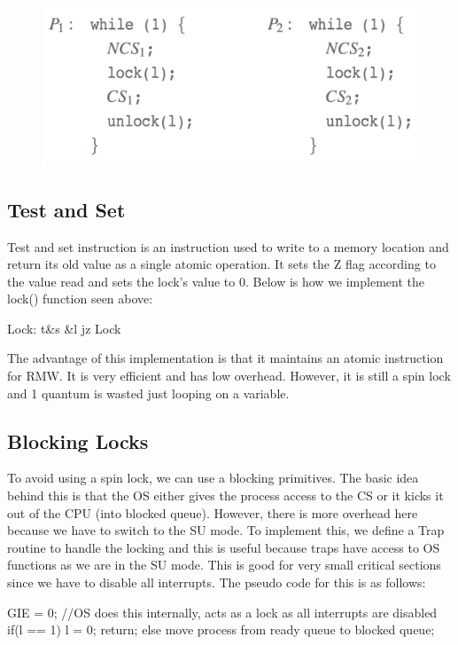 \documentclass{hw}
\begin{document}
\begin{figure}[H]
  \centering
  \includegraphics[scale=.4]{img/lock}
\end{figure}

\subsection{Test and Set}
Test and set instruction is an instruction used to write to a memory location 
and return its old value as a single atomic operation. It sets the Z flag 
according to the value read and sets the lock's value to 0. Below is how we
implement the lock() function seen above:
\begin{C}
Lock:   t&s &l
        jz Lock
\end{C} 
The advantage of this implementation is that it maintains an atomic instruction 
for RMW. It is very efficient and has low overhead. However, it is still a 
spin lock and 1 quantum is wasted just looping on a variable.
    
\subsection{Blocking Locks}
To avoid using a spin lock, we can use a blocking primitives. The basic idea behind
this is that the OS either gives the process access to the CS or it kicks it out
of the CPU (into blocked queue). However, there is more overhead here because we
have to switch to the SU mode. To implement this, we define a Trap routine to handle
the locking and this is useful because traps have access to OS functions as we are
in the SU mode. This is good for very small critical sections since we have to 
disable all interrupts. The pseudo code for this is as follows:
\begin{C}
GIE = 0; //OS does this internally, acts as a lock as all interrupts are disabled
if(l == 1){
  l = 0;
  return;
}
else{
  move process from ready queue to blocked queue;
}
\end{C}
\end{document}
